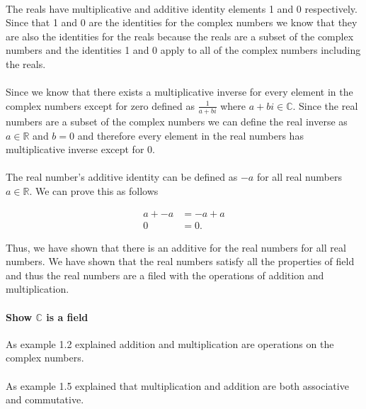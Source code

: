 \documentclass{article}
\begin{document}
      \paragraph{}
      The reals have multiplicative and additive identity elements 1 and 0 respectively. Since that 1 and 0 are the identities for the complex numbers we know that they are also the identities for the reals because the reals are a subset of the complex numbers and the identities 1 and 0 apply to all of the complex numbers including the reals.

      \paragraph{}
      Since we know that there exists a multiplicative inverse for every element in the complex numbers except for zero defined as $\frac{1}{a+bi}$ where $a+bi \in \mathbb{C}$. Since the real numbers are a subset of the complex numbers we can define the real inverse as $a \in \mathbb{R}$ and $b = 0$ and therefore every element in the real numbers has multiplicative inverse except for 0.

      \paragraph{}
      The real number's additive identity can be defined as $-a$ for all real numbers $a \in \mathbb{R}$. We can prove this as follows

      \[
        \begin{split}
          a + -a &= -a + a\\
          0 &= 0.
        \end{split}
      \]

      Thus, we have shown that there is an additive for the real numbers for all real numbers. We have shown that the real numbers satisfy all the properties of field and thus the real numbers are a filed with the operations of addition and multiplication.

      \paragraph{Show $\mathbb{C}$ is a field}
      As example 1.2 explained addition and multiplication are operations on the complex numbers.

      \paragraph{}
      As example 1.5 explained that multiplication and addition are both associative and commutative.
\end{document}
